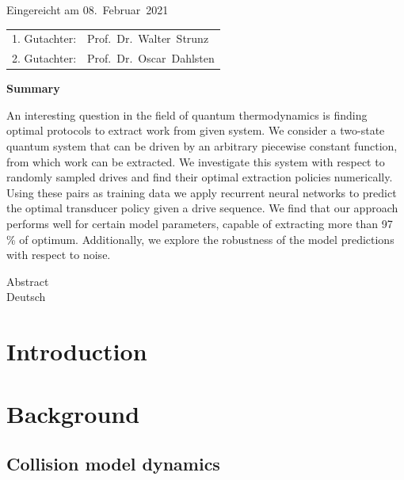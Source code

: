 \thispagestyle{empty}\vspace*{48em}

Eingereicht am 08.~Februar~2021\vspace{1.5em}
\par{\large\begin{tabular}{ll}
 1. Gutachter: & Prof.~Dr.~Walter~Strunz \\
 2. Gutachter: & Prof.~Dr.~Oscar~Dahlsten \\
\end{tabular}}


\newpage
\begin{center}\large\bfseries Summary\end{center}
%
%
An interesting question in the field of quantum thermodynamics is finding optimal protocols to extract work from given system.
We consider a two-state quantum system that can be driven by an arbitrary piecewise constant function, from which work can be extracted.
We investigate this system with respect to randomly sampled drives and find their optimal extraction policies numerically.
Using these pairs as training data we apply recurrent neural networks to predict the optimal transducer policy given a drive sequence.
We find that our approach performs well for certain model parameters, capable of extracting more than 97 \% of optimum.
Additionally, we explore the robustness of the model predictions with respect to noise.

\vspace{20em}
Abstract \\ 
Deutsch \\
 
 
\tableofcontents



\mainmatter

\chapter{Introduction}


\chapter{Background} \label{background}
\section{Collision model dynamics} \label{col_model}


